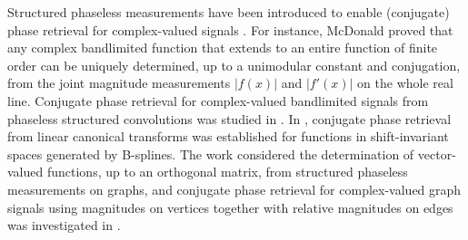\documentclass[11pt,oneside,reqno]{amsart}
\numberwithin{equation}{section}
\begin{document}
Structured phaseless measurements have been introduced to enable (conjugate) phase retrieval for complex-valued signals 
\cite{Chen2022, CQ22, Cheng2025, jaming14, LLW21,Mcdonald,  pohl2014}.
For instance, McDonald \cite{Mcdonald} proved that any complex bandlimited function
that extends to an entire function of finite order can be uniquely determined, up to
a unimodular constant and conjugation, from the joint magnitude measurements
$|f(x)|$ and $|f'(x)|$ on the whole real line.
Conjugate phase retrieval for complex-valued bandlimited signals from phaseless
structured convolutions was studied in \cite{LLW21}. In \cite{CQ22}, conjugate phase retrieval from linear canonical transforms was established for functions in
shift-invariant spaces generated by B-splines. The work \cite{Chen2022} considered the determination of vector-valued functions,
up to an orthogonal matrix, from structured phaseless measurements on graphs,  and conjugate phase retrieval for
complex-valued graph signals using magnitudes on vertices together with relative
magnitudes on edges was investigated in \cite{Cheng2025}. 
\end{document}
